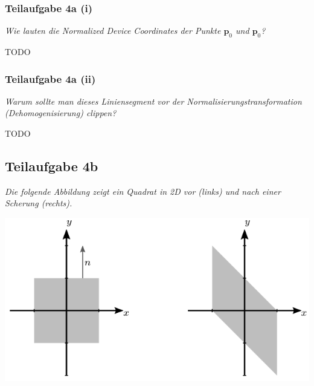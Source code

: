 \documentclass[a4paper]{scrartcl}
\begin{document}
\subsubsection*{Teilaufgabe 4a (i)}
\textit{Wie lauten die Normalized Device Coordinates der Punkte $\mathbf{p}_0$
und $\mathbf{p}_0$?}

TODO

\subsubsection*{Teilaufgabe 4a (ii)}
\textit{Warum sollte man dieses Liniensegment vor der Normalisierungstransformation
(Dehomogenisierung) clippen?}

TODO

\subsection*{Teilaufgabe 4b}
\textit{Die folgende Abbildung zeigt ein Quadrat in 2D vor (links) und nach einer Scherung
(rechts).}

\includegraphics*[width=0.5\linewidth, keepaspectratio]{4b.png}
\end{document}
